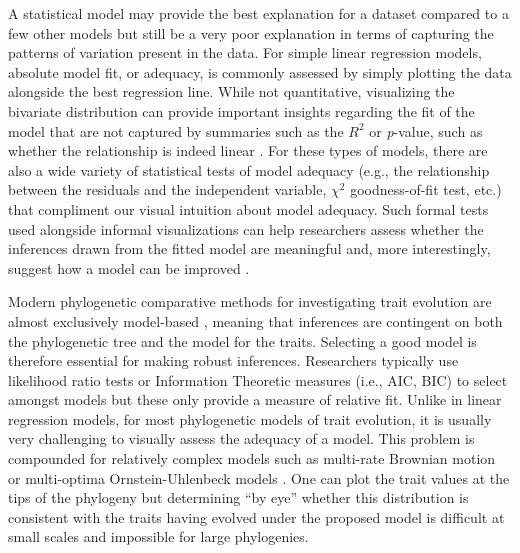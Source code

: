 A statistical model may provide the best explanation for a dataset compared to a few other models but still be a very poor explanation in terms of capturing the patterns of variation present in the data. For simple linear regression models, absolute model fit, or adequacy, is commonly assessed by simply plotting the data alongside the best regression line. While not quantitative, visualizing the bivariate distribution can provide important insights regarding the fit of the model that are not captured by summaries such as the $R^2$ or \emph{p}-value, such as whether the relationship is indeed linear \citep[for a classic case study, see][]{anscombe1973}. For these types of models, there are also a wide variety of statistical tests of model adequacy (e.g., the relationship between the residuals and the independent variable, $\chi^2$ goodness-of-fit test, etc.) that compliment our visual intuition about model adequacy. Such formal tests used alongside informal visualizations can help researchers assess whether the inferences drawn from the fitted model are meaningful and, more interestingly, suggest how a model can be improved \citep{Gelman2012}.

Modern phylogenetic comparative methods for investigating trait evolution are almost exclusively model-based \citep[recently reviewed in][]{Omeara2012, PennellHarmon}, meaning that inferences are contingent on both the phylogenetic tree and the model for the traits. Selecting a good model is therefore essential for making robust inferences. Researchers typically use likelihood ratio tests or Information Theoretic measures (i.e., AIC, BIC) to select amongst models \citep{Mooers1999, Harmon2010, Hunt2012} but these only provide a measure of relative fit. Unlike in linear regression models, for most phylogenetic models of trait evolution, it is usually very challenging to visually assess the adequacy of a model. This problem is compounded for relatively complex models such as multi-rate Brownian motion \citep{Omeara2006, Eastman2011} or multi-optima Ornstein-Uhlenbeck models \citep{Hansen1997, ButlerKing2004, Beaulieu2012, UyedaBayou}. One can plot the trait values at the tips of the phylogeny but determining ``by eye'' whether this distribution is consistent with the traits having evolved under the proposed model is difficult at small scales and impossible for large phylogenies.

